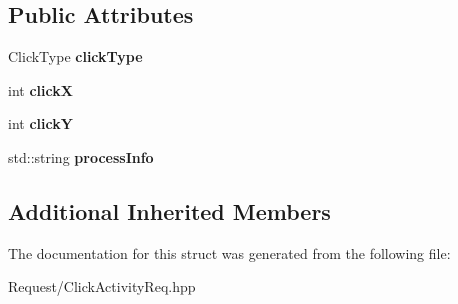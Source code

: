 \subsection*{Public Attributes}
\begin{DoxyCompactItemize}
\item 
\mbox{\label{structts_1_1common_1_1_click_activity_req_addbe8081a2c2f4654dc22247b60a78e4}} 
Click\+Type {\bfseries click\+Type}
\item 
\mbox{\label{structts_1_1common_1_1_click_activity_req_a9348fe09e1bd80c0786a4fb109877b76}} 
int {\bfseries clickX}
\item 
\mbox{\label{structts_1_1common_1_1_click_activity_req_a60a336ea52f8cd234578c9c29224589e}} 
int {\bfseries clickY}
\item 
\mbox{\label{structts_1_1common_1_1_click_activity_req_ab07ecd544a06dd822ee4be0d98b070af}} 
std\+::string {\bfseries process\+Info}
\end{DoxyCompactItemize}
\subsection*{Additional Inherited Members}


The documentation for this struct was generated from the following file\+:\begin{DoxyCompactItemize}
\item 
Request/Click\+Activity\+Req.\+hpp\end{DoxyCompactItemize}
